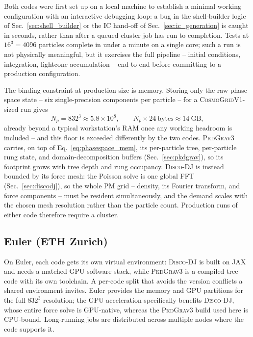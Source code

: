 \documentclass{report}
\begin{document}
Both codes were first set up on a local machine to establish a minimal working configuration with an interactive debugging loop: a bug in the shell-builder logic of Sec.~\ref{sec:shell_builder} or the IC hand-off of Sec.~\ref{sec:ic_generation} is caught in seconds, rather than after a queued cluster job has run to completion. Tests at $16^3 = 4096$ particles complete in under a minute on a single core; such a run is not physically meaningful, but it exercises the full pipeline -- initial conditions, integration, lightcone accumulation -- end to end before committing to a production configuration.

The binding constraint at production size is memory. Storing only the raw phase-space state -- six single-precision components per particle -- for a \textsc{CosmoGridV1}-sized run gives
\begin{equation}
    N_p = 832^3 \approx 5.8\times10^{8}, \qquad
    N_p \times 24\ \text{bytes} \approx 14\ \text{GB},
    \label{eq:phasespace_mem}
\end{equation}
already beyond a typical workstation's RAM once any working headroom is included -- and this floor is exceeded differently by the two codes. \textsc{PkdGrav3} carries, on top of Eq.~\eqref{eq:phasespace_mem}, its per-particle tree, per-particle rung state, and domain-decomposition buffers (Sec.~\ref{sec:pkdgrav}), so its footprint grows with tree depth and rung occupancy. \textsc{Disco-DJ} is instead bounded by its force mesh: the Poisson solve is one global FFT (Sec.~\ref{sec:discodj}), so the whole PM grid -- density, its Fourier transform, and force components -- must be resident simultaneously, and the demand scales with the chosen mesh resolution rather than the particle count. Production runs of either code therefore require a cluster.

\subsection{Euler (ETH Zurich)}

On Euler, each code gets its own virtual environment: \textsc{Disco-DJ} is built on JAX and needs a matched GPU software stack, while \textsc{PkdGrav3} is a compiled tree code with its own toolchain. A per-code split that avoids the version conflicts a shared environment invites. Euler provides the memory and GPU partitions for the full $832^3$ resolution; the GPU acceleration specifically benefits \textsc{Disco-DJ}, whose entire force solve is GPU-native, whereas the \textsc{PkdGrav3} build used here is CPU-bound. Long-running jobs are distributed across multiple nodes where the code supports it.
\end{document}
